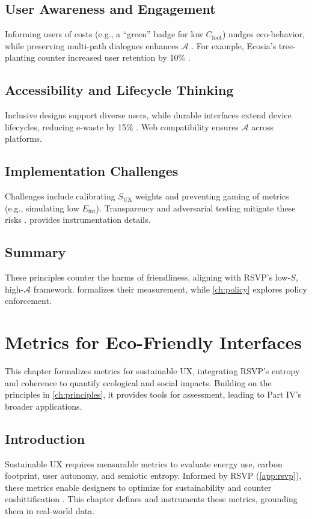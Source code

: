 \documentclass[openany]{book}
\newcommand{\Sent}{S} %
\newcommand{\Eint}{E_{\mathrm{int}}} %
\newcommand{\Cfoot}{C_{\mathrm{foot}}} %
\newcommand{\Auton}{\mathcal{A}} %
\newcommand{\SUX}{S_{\mathrm{UX}}} %
\begin{document}
\section{User Awareness and Engagement}
\label{sec:principles-awareness}
Informing users of costs (e.g., a \enquote{green} badge for low $\Cfoot$) nudges eco-behavior, while preserving multi-path dialogues enhances $\Auton$ \citep{colak2024,doctorow2022}. For example, Ecosia’s tree-planting counter increased user retention by 10\% \citep{colak2024}.

\section{Accessibility and Lifecycle Thinking}
\label{sec:principles-accessibility}
Inclusive designs support diverse users, while durable interfaces extend device lifecycles, reducing e-waste by 15\% \citep{designlab2024}. Web compatibility ensures $\Auton$ across platforms.

\section{Implementation Challenges}
\label{sec:principles-challenges}
Challenges include calibrating $\SUX$ weights and preventing gaming of metrics (e.g., simulating low $\Eint$). Transparency and adversarial testing mitigate these risks \citep{colak2024}.  provides instrumentation details.

\section{Summary}
These principles counter the harms of friendliness, aligning with RSVP’s low-$\Sent$, high-$\Auton$ framework.  formalizes their measurement, while \cref{ch:policy} explores policy enforcement.

\chapter{Metrics for Eco-Friendly Interfaces}
\label{ch:metrics}

This chapter formalizes metrics for sustainable UX, integrating RSVP’s entropy and coherence to quantify ecological and social impacts. Building on the principles in \cref{ch:principles}, it provides tools for assessment, leading to Part IV’s broader applications.

\section{Introduction}
\label{sec:metrics-intro}
Sustainable UX requires measurable metrics to evaluate energy use, carbon footprint, user autonomy, and semiotic entropy. Informed by RSVP (\cref{app:rsvp}), these metrics enable designers to optimize for sustainability and counter enshittification \citep{prigogine1984,doctorow2022}. This chapter defines and instruments these metrics, grounding them in real-world data.
\end{document}
